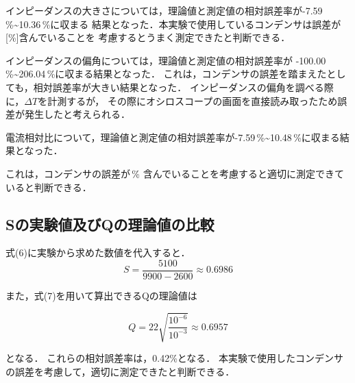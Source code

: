 インピーダンスの大きさについては，理論値と測定値の相対誤差率が-7.59\,\%\sim10.36\,\%に収まる
結果となった．本実験で使用しているコンデンサは誤差が[\%]含んでいることを
考慮するとうまく測定できたと判断できる．

インピーダンスの偏角については，理論値と測定値の相対誤差率が
-100.00\,\%\sim206.04\,\%に収まる結果となった．
これは，コンデンサの誤差を踏まえたとしても，相対誤差率が大きい結果となった．
インピーダンスの偏角を調べる際に，$\Delta T$を計測するが，
その際にオシロスコープの画面を直接読み取ったため誤差が発生したと考えられる．

電流相対比について，理論値と測定値の相対誤差率が-7.59\,\%\sim10.48\,\%に収まる結果となった．

これは，コンデンサの誤差が\,\%
含んでいることを考慮すると適切に測定できていると判断できる．

\subsection{Sの実験値及びQの理論値の比較}
式(6)に実験から求めた数値を代入すると．
$$
S=\frac{5100}{9900-2600}\approx 0.6986
$$

また，式(7)を用いて算出できるQの理論値は

$$
Q=22\sqrt{\frac{10^{-6}}{10^{-3}}}\approx 0.6957
$$

となる．
これらの相対誤差率は，0.42\%となる．
本実験で使用したコンデンサの誤差を考慮して，適切に測定できたと判断できる．